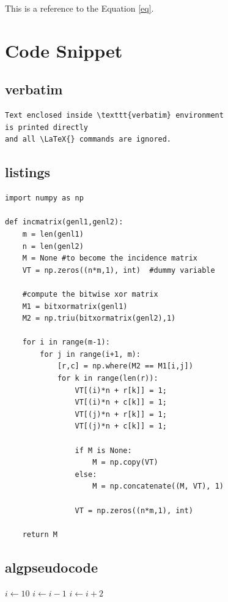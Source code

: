 This is a reference to the Equation \ref{eq}.

\section{Code Snippet}

\subsection{verbatim}
\begin{verbatim}
Text enclosed inside \texttt{verbatim} environment 
is printed directly 
and all \LaTeX{} commands are ignored.
\end{verbatim}

\subsection{listings}
\begin{lstlisting}
import numpy as np
    
def incmatrix(genl1,genl2):
    m = len(genl1)
    n = len(genl2)
    M = None #to become the incidence matrix
    VT = np.zeros((n*m,1), int)  #dummy variable
    
    #compute the bitwise xor matrix
    M1 = bitxormatrix(genl1)
    M2 = np.triu(bitxormatrix(genl2),1) 

    for i in range(m-1):
        for j in range(i+1, m):
            [r,c] = np.where(M2 == M1[i,j])
            for k in range(len(r)):
                VT[(i)*n + r[k]] = 1;
                VT[(i)*n + c[k]] = 1;
                VT[(j)*n + r[k]] = 1;
                VT[(j)*n + c[k]] = 1;
                
                if M is None:
                    M = np.copy(VT)
                else:
                    M = np.concatenate((M, VT), 1)
                
                VT = np.zeros((n*m,1), int)
    
    return M
\end{lstlisting}

\subsection{algpseudocode}
\begin{algorithmic}
\State $i \gets 10$
    \State $i \gets i-1$
\Else
        \State $i \gets i+2$
    \EndIf
\EndIf 
\end{algorithmic}


